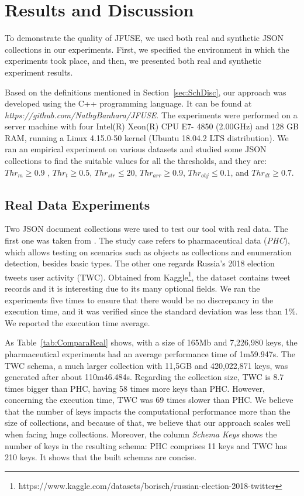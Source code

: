\section{Results and Discussion}
\label{sec:ResDisc}
To demonstrate the quality of JFUSE, we used both real and synthetic JSON collections in our experiments. First, we specified the environment in which the experiments took place, and then, we presented both real and synthetic experiment results.

Based on the definitions mentioned in Section~\ref{sec:SchDisc}, our approach was developed using the C++ programming language. 
It can be found  at \textit{https://github.com/NathyBanhara/JFUSE}. 
The experiments were performed on a server machine with four Intel(R) Xeon(R) CPU E7- 4850 (2.00GHz) and 128 GB RAM, running a Linux 4.15.0-50 kernel (Ubuntu 18.04.2 LTS distribution).  
We ran an empirical experiment on various datasets and studied some JSON collections to find the suitable values for all the thresholds, and they are: 
\(Thr_m \geq 0.9\) , 
\(Thr_t \geq 0.5\), 
\(Thr_{str} \leq 20\), 
\(Thr_{arr} \geq 0.9\), 
\(Thr_{obj} \leq 0.1\), and 
\(Thr_{dt} \geq 0.7\).


\subsection{Real Data Experiments}
Two JSON document collections were used to test our tool with real data.  
The first one was taken from \citep{Sp+21}. The study case refers to pharmaceutical data (\textit{PHC}), which allows testing on scenarios such as objects as collections and enumeration detection, besides basic types. 
The other one regards Russia's 2018 election tweets user activity (TWC). Obtained from Kaggle\footnote{https://www.kaggle.com/datasets/borisch/russian-election-2018-twitter}, the dataset contains tweet records and it is interesting due to its many optional fields. 
We ran the experiments five times to ensure that there would be no discrepancy in the execution time, and it was verified since the standard deviation was less than 1\%. We reported the execution time average. 

%
As Table~\ref{tab:ComparaReal} shows, with a size of 165Mb and 7,226,980 keys, the pharmaceutical experiments had an average performance time of 1m59.947s. The TWC schema, a much larger collection with 11,5GB and 420,022,871 keys, was generated after about 110m46.484s. 
Regarding the collection size, TWC is 8.7 times bigger than PHC, having 58 times more keys than PHC. 
However, concerning the execution time, TWC was 69 times slower than PHC. 
We believe that the number of keys impacts the computational performance more than the size of collections, and because of that, we believe that our approach scales well when facing huge collections. 
Moreover, the column \textit{Schema Keys} shows the number of keys in the resulting schema: PHC comprises 11 keys and TWC has 210 keys. It shows that the built schemas are concise.

